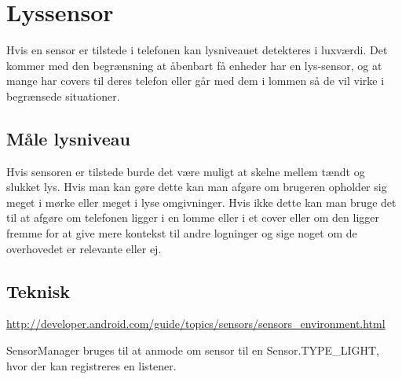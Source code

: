 \section{Lyssensor}
Hvis en sensor er tilstede i telefonen kan lysniveauet detekteres i luxværdi. Det kommer med den begrænsning at åbenbart få enheder har en lys-sensor, og at mange har covers til deres telefon eller går med dem i lommen så de vil virke i begrænsede situationer.

\subsection{Måle lysniveau}
Hvis sensoren er tilstede burde det være muligt at skelne mellem tændt og slukket lys. Hvis man kan gøre dette kan man afgøre om brugeren opholder sig meget i mørke eller meget i lyse omgivninger. Hvis ikke dette kan man bruge det til at afgøre om telefonen ligger i en lomme eller i et cover eller om den ligger fremme for at give mere kontekst til andre logninger og sige noget om de overhovedet er relevante eller ej.

\subsection{Teknisk}
\url{http://developer.android.com/guide/topics/sensors/sensors_environment.html}

SensorManager bruges til at anmode om sensor til en Sensor.TYPE\_LIGHT, hvor der kan registreres en listener.
